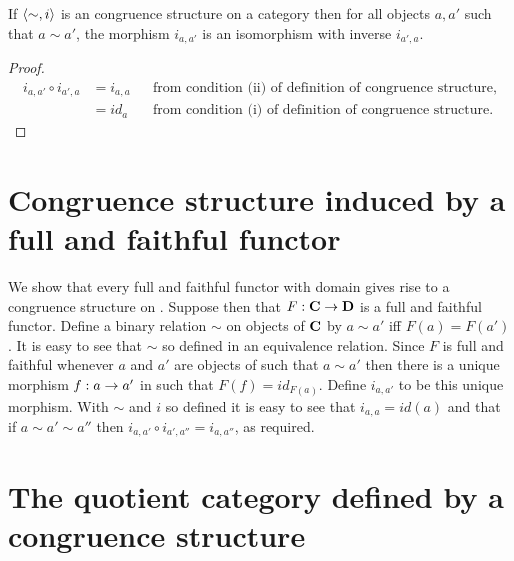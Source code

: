 \documentclass[10pt,a4paper]{article}
\theoremstyle{remark}
\begin{document}
\begin{lemma}
If $\langle\sim,i\rangle$ is an congruence structure on a category \catcw then
for all objects $a,a'$ such that $a \sim a'$, the morphism $i_{a,a'}$ is an isomorphism with inverse $i_{a',a}$.
\end{lemma}
\begin{proof}
\begin{align*}
i_{a,a'} \circ i_{a',a} &= i_{a,a} &&\mbox{from condition (ii) of definition of congruence structure}, \\
                        &= id_a    &&\mbox{from condition (i) of definition of congruence structure}.
\end{align*}
\end{proof}

\section{Congruence structure induced by a full and faithful functor}
We show that every full and faithful functor with domain \catcw gives rise to a congruence structure on \catc.
Suppose then that $F:\textbf{C} \rightarrow \textbf{D}$ is  a full and faithful functor. 
Define a binary relation $\sim$ on objects of $\textbf{C}$ by $a \sim a'$ iff $F(a) = F(a')$. It is easy to see that $\sim$ so defined in an equivalence relation. Since $F$ is full and faithful 
whenever $a$ and $a'$ are objects of \catcw such that $a \sim a'$ then there is a unique morphism 
$f:a \rightarrow a'$ in \catcw such that $F(f)=id_{F(a)}$. Define $i_{a,a'}$ to be this 
unique morphism. With $\sim$ and $i$ so defined it is easy to see that
$i_{a,a}=id(a)$ and that if $a \sim a' \sim a''$ then $i_{a,a'} \circ i_{a',a''}=i_{a,a''}$, as required.  

\section{The quotient category defined by a congruence structure}
\end{document}
